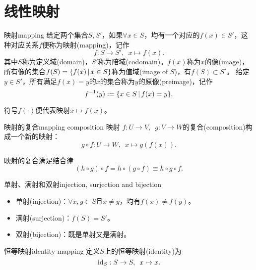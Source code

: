 \chapter{线性映射}
\label{chap:linear mapping}

\begin{definition}{映射}{mapping}
	给定两个集合$S,S'$，如果$\forall x\in S$，均有一个对应的$f(x)\in S'$，这种对应关系$f$便称为映射(mapping)，记作
	\begin{equation}
		f:S\to S',\enspace x\mapsto f(x).
	\end{equation}
	其中$S$称为定义域(domain)，$S'$称为陪域(codomain)。$f(x)$称为$x$的像(image)，所有像的集合$f(S)=\{f(x)\,|\,x\in S\}$称为值域(image of $S$)，有$f(S)\subset S'$。
	\tcblower
	给定$y\in S'$，所有满足$f(x)=y$的$x$的集合称为$y$的原像(preimage)，记作
	\begin{equation}
		f^{-1}(y):=\{x\in S\,|\,f(x)=y\}.
	\end{equation}
\end{definition}

\begin{remark}
	符号$f(\cdot)$便代表映射$x\mapsto f(x)$。
\end{remark}

\begin{definition}{映射的复合}{mapping composition}
	映射 $f:U\to V,\enspace g:V\to W$的复合(composition)构成一个新的映射：
	\[
		g\circ f:U\to W,\enspace x\mapsto g(f(x)).
	\]
\end{definition}
\begin{corollary}
	映射的复合满足结合律
	\[
		(h\circ g)\circ f=h\circ (g\circ f)\equiv h\circ g\circ f.
	\]
\end{corollary}
\begin{definition}{单射、满射和双射}{injection, surjection and bijection}
	\begin{itemize}
		\item 单射(injection)：$\forall x,y\in S$且$x\neq y$，均有$f(x)\neq f(y)$。
		\item 满射(surjection)：$f(S)=S'$。
		\item 双射(bijection)：既是单射又是满射。
	\end{itemize}
\end{definition}

\begin{definition}
	{恒等映射}{identity mapping}
	定义$S$上的恒等映射(identity)为
	\begin{equation}
		\operatorname{id}_S:S\to S,\enspace x\mapsto x.
	\end{equation}
\end{definition}

